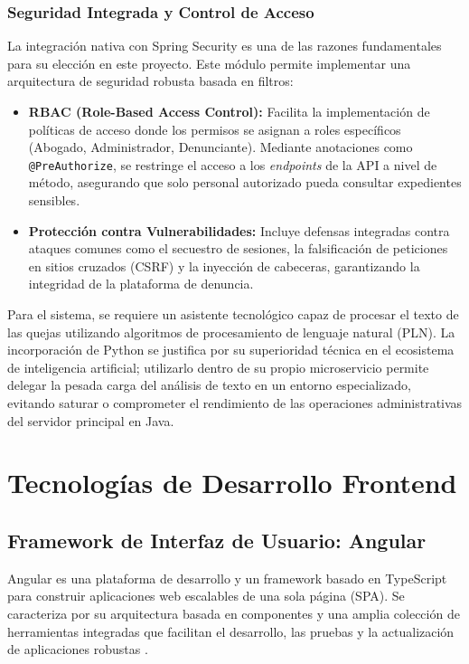 \subsubsection{Seguridad Integrada y Control de Acceso}

La integración nativa con Spring Security es una de las razones fundamentales para su elección en este proyecto. Este módulo permite implementar una arquitectura de seguridad robusta basada en filtros:
\begin{itemize}
\item \textbf{RBAC (Role-Based Access Control):} Facilita la implementación de políticas de acceso donde los permisos se asignan a roles específicos (Abogado, Administrador, Denunciante). Mediante anotaciones como \texttt{@PreAuthorize}, se restringe el acceso a los \textit{endpoints} de la API a nivel de método, asegurando que solo personal autorizado pueda consultar expedientes sensibles.
\item \textbf{Protección contra Vulnerabilidades:} Incluye defensas integradas contra ataques comunes como el secuestro de sesiones, la falsificación de peticiones en sitios cruzados (CSRF) y la inyección de cabeceras, garantizando la integridad de la plataforma de denuncia.
\end{itemize}

Para el sistema, se requiere un asistente tecnológico capaz de procesar el texto de las quejas utilizando algoritmos de procesamiento de lenguaje natural (PLN). La incorporación de Python se justifica por su superioridad técnica en el ecosistema de inteligencia artificial; utilizarlo dentro de su propio microservicio permite delegar la pesada carga del análisis de texto en un entorno especializado, evitando saturar o comprometer el rendimiento de las operaciones administrativas del servidor principal en Java.

\section{Tecnologías de Desarrollo Frontend}
\subsection{Framework de Interfaz de Usuario: Angular}
Angular es una plataforma de desarrollo y un framework basado en TypeScript para construir aplicaciones web escalables de una sola página (SPA). Se caracteriza por su arquitectura basada en componentes y una amplia colección de herramientas integradas que facilitan el desarrollo, las pruebas y la actualización de aplicaciones robustas \cite{41} .

